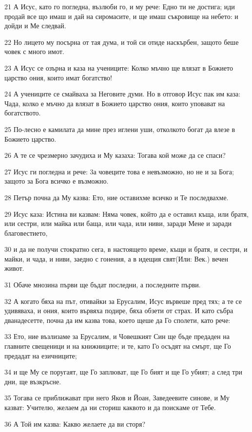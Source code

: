 \par 21 А Исус, като го погледна, възлюби го, и му рече: Едно ти не достига; иди продай все що имаш и дай на сиромасите, и ще имаш съкровище на небето: и дойди и Ме следвай.
\par 22 Но лицето му посърна от тая дума, и той си отиде наскърбен, защото беше човек с много имот.
\par 23 А Исус се озърна и каза на учениците: Колко мъчно ще влязат в Божието царство ония, които имат богатство!
\par 24 А учениците се смайваха за Неговите думи. Но в отговор Исус пак им каза: Чада, колко е мъчно да влязат в Божието царство ония, които уповават на богатството.
\par 25 По-лесно е камилата да мине през иглени уши, отколкото богат да влезе в Божието царство.
\par 26 А те се чрезмерно зачудиха и Му казаха: Тогава кой може да се спаси?
\par 27 Исус ги погледна и рече: 3а човеците това е невъзможно, но не и за Бога; защото за Бога всичко е възможно.
\par 28 Петър почна да Му казва: Ето, ние оставихме всичко и Те последвахме.
\par 29 Исус каза: Истина ви казвам: Няма човек, който да е оставил къща, или братя, или сестри, или майка или баща, или чада, или ниви, заради Мене и заради благовестието,
\par 30 и да не получи стократно сега, в настоящето време, къщи и братя, и сестри, и майки, и чада, и ниви, заедно с гонения, а в идещия свят(Или: Век.) вечен живот.
\par 31 Обаче мнозина първи ще бъдат последни, а последните първи.
\par 32 А когато бяха на път, отивайки за Ерусалим, Исус вървеше пред тях; а те се удивяваха, и ония, които вървяха подире, бяха обзети от страх. И като събра дванадесетте, почна да им казва това, което щеше да Го сполети, като рече:
\par 33 Ето, ние възлизаме за Ерусалим, и Човешкият Син ще бъде предаден на главните свещеници и на книжниците; и те, като Го осъдят на смърт, ще Го предадат на езичниците;
\par 34 и ще Му се поругаят, ще Го заплюват, ще Го бият и ще Го убият; а след три дни, ще възкръсне.
\par 35 Тогава се приближават при него Яков и Йоан, Заведеевите синове, и Му казват: Учителю, желаем да ни сториш каквото и да поискаме от Тебе.
\par 36 А Той им казва: Какво желаете да ви сторя?
